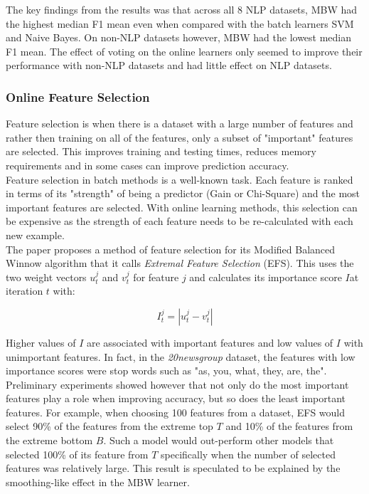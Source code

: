 \documentclass{article}
\begin{document}
The key findings from the results was that across all 8 NLP datasets, MBW had the highest median F1 mean even when compared with the batch learners SVM and Naive Bayes.
On non-NLP datasets however, MBW had the lowest median F1 mean. The effect of voting on the online learners only seemed to improve their performance 
with non-NLP datasets and had little effect on NLP datasets.

\subsubsection*{Online Feature Selection}

Feature selection is when there is a dataset with a large number of features and rather then training on all of the features, only a 
subset of "important" features are selected. This improves training and testing times, reduces memory requirements and in some cases 
can improve prediction accuracy.\\

Feature selection in batch methods is a well-known task. Each feature is ranked in terms of its "strength" of being a predictor 
(Gain or Chi-Square) and the most important features are selected. With online learning methods, this selection can be expensive 
as the strength of each feature needs to be re-calculated with each new example.\\

The paper proposes a method of feature selection for its Modified Balanced Winnow algorithm that it calls \emph{Extremal Feature Selection} (EFS).
This uses the two weight vectors \(u_{t}^{j}\) and \(v_{t}^{j}\) for feature \(j\) and calculates its importance score \(I\)at iteration \(t\) with:

\[
    I_{t}^{j} = |u_{t}^{j} - v_{t}^{j}|
\]

Higher values of \(I\) are associated with important features and low values of \(I\) with unimportant features. In fact, in the \emph{20newsgroup} dataset,
the features with low importance scores were stop words such as "as, you, what, they, are, the".\\

Preliminary experiments showed however that not only do the most important features play a role when improving accuracy, but so does the least 
important features. For example, when choosing 100 features from a dataset, EFS would select 90\% of the features from the extreme top \(T\)
and 10\% of the features from the extreme bottom \(B\). Such a model would out-perform other models that selected 100\% of its feature from \(T\)
specifically when the number of selected features was relatively large. This result is speculated to be explained by the smoothing-like effect
in the MBW learner.
\end{document}
